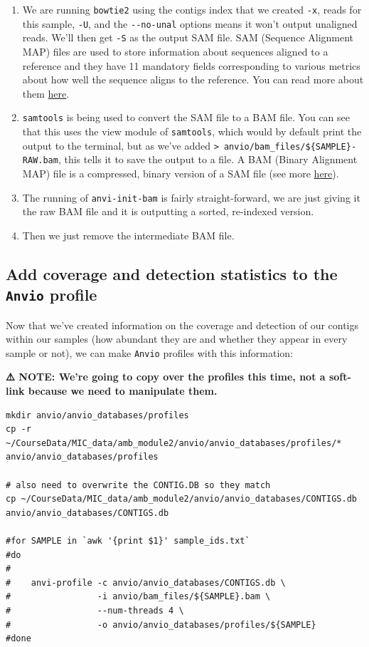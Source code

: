 \documentclass[
]{book}
\providecommand{\tightlist}{%
  \setlength{\itemsep}{0pt}\setlength{\parskip}{0pt}}
\begin{document}
\begin{enumerate}
\def\labelenumi{\arabic{enumi}.}
\tightlist
\item
  We are running \texttt{bowtie2} using the contigs index that we created \texttt{-x}, reads for this sample, \texttt{-U}, and the \texttt{-\/-no-unal} options means it won't output unaligned reads. We'll then get \texttt{-S} as the output SAM file. SAM (Sequence Alignment MAP) files are used to store information about sequences aligned to a reference and they have 11 mandatory fields corresponding to various metrics about how well the sequence aligns to the reference. You can read more about them \href{https://samtools.github.io/hts-specs/SAMv1.pdf}{here}.
\item
  \texttt{samtools} is being used to convert the SAM file to a BAM file. You can see that this uses the view module of \texttt{samtools}, which would by default print the output to the terminal, but as we've added \texttt{\textgreater{}\ anvio/bam\_files/\$\{SAMPLE\}-RAW.bam}, this tells it to save the output to a file. A BAM (Binary Alignment MAP) file is a compressed, binary version of a SAM file (see more \href{https://samtools.github.io/hts-specs/SAMv1.pdf}{here}).
\item
  The running of \texttt{anvi-init-bam} is fairly straight-forward, we are just giving it the raw BAM file and it is outputting a sorted, re-indexed version.
\item
  Then we just remove the intermediate BAM file.
\end{enumerate}

\subsection{\texorpdfstring{Add coverage and detection statistics to the \texttt{Anvi\textquotesingle{}o} profile}{Add coverage and detection statistics to the Anvi\textquotesingle o profile}}\label{add-coverage-and-detection-statistics-to-the-anvio-profile}

Now that we've created information on the coverage and detection of our contigs within our samples (how abundant they are and whether they appear in every sample or not), we can make \texttt{Anvi\textquotesingle{}o} profiles with this information:

\textbf{⚠️ NOTE: We're going to copy over the profiles this time, not a soft-link because we need to manipulate them.}

\begin{verbatim}
mkdir anvio/anvio_databases/profiles
cp -r ~/CourseData/MIC_data/amb_module2/anvio/anvio_databases/profiles/* anvio/anvio_databases/profiles

# also need to overwrite the CONTIG.DB so they match
cp ~/CourseData/MIC_data/amb_module2/anvio/anvio_databases/CONTIGS.db  anvio/anvio_databases/CONTIGS.db 

#for SAMPLE in `awk '{print $1}' sample_ids.txt`
#do
#
#    anvi-profile -c anvio/anvio_databases/CONTIGS.db \
#                 -i anvio/bam_files/${SAMPLE}.bam \
#                 --num-threads 4 \
#                 -o anvio/anvio_databases/profiles/${SAMPLE}
#done
\end{verbatim}
\end{document}
